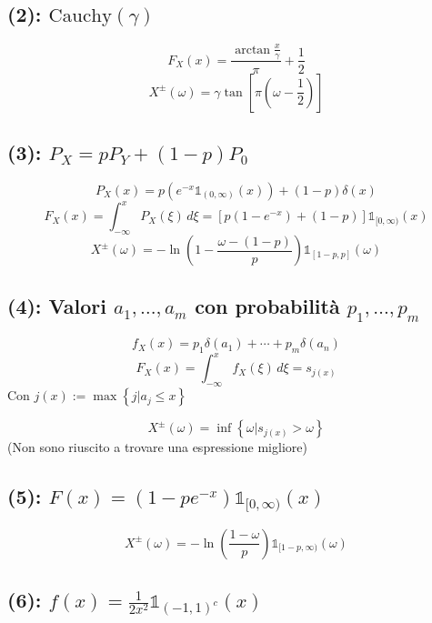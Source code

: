 \documentclass{article}
\begin{document}
\subsection{(2): $\mathrm{Cauchy}(\gamma)$}
\[
	F_X(x) = \frac{\arctan \frac{x}{\gamma}}{\pi} + \frac{1}{2}
\]
\[
	X^\pm(\omega) = \gamma \tan \left[\pi\left(\omega - \frac{1}{2}\right)\right]
\]


\subsection{(3): $P_X = pP_Y + (1-p)P_0$}
\[
	P_X(x) = p\left(e^{-x} \mathds{1}_{(0,\infty )}(x)\right) + (1-p) \delta(x)
\]
\[
	F_X(x) = \int_{-\infty }^{x} P_X \left(\xi\right) \, d\xi = \left[p\left(1-e^{-x}\right) + \left(1-p\right)\right] \mathds{1}_{[0,\infty )} (x)
\]
\[
	X^\pm(\omega) = -\ln \left(1- \frac{\omega-(1-p)}{p}\right) \mathds{1}_{[1-p,p]}(\omega)
\]

\subsection{(4): Valori $a_1, \dotsc, a_m$ con probabilità $p_1, \dotsc, p_m$}
\[
	f_X(x) = p_1 \delta(a_1) + \dotsb + p_m \delta(a_n)
\]
\[
	F_X(x) = \int_{-\infty }^{x} f_X \left(\xi\right) \, d\xi = s_{j(x)}
\]
Con $j(x) := \max\left\{j | a_j\leq x\right\}$

\[
	X^\pm (\omega) = \inf\left\{\omega | s_{j(x)} > \omega\right\}
\]
(Non sono riuscito a trovare una espressione migliore)

\subsection{(5): $F(x) = \left(1- pe^{-x}\right) \mathds{1}_{[0, \infty )}(x)$}
\[
	X^\pm\left(\omega\right) = - \ln\left(\frac{1-\omega}{p}\right) \mathds{1}_{[1-p,\infty )}(\omega)
\]

\subsection{(6): $f(x) = \frac{1}{2x^2} \mathds{1}_{(-1,1)^c}(x)$}
\end{document}
